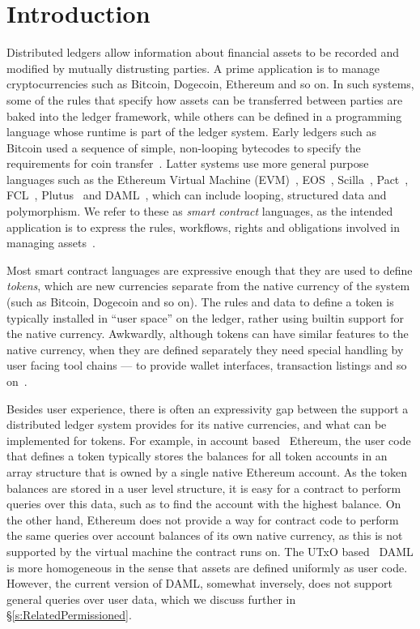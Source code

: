 
\section{Introduction}
Distributed ledgers allow information about financial assets to be recorded and modified by mutually distrusting parties. A prime application is to manage cryptocurrencies such as Bitcoin, Dogecoin, Ethereum and so on. In such systems, some of the rules that specify how assets can be transferred between parties are baked into the ledger framework, while others can be defined in a programming language whose runtime is part of the ledger system. Early ledgers such as Bitcoin used a sequence of simple, non-looping bytecodes to specify the requirements for coin transfer~\cite{Atzei2017:BitcoinTransactions}. Latter systems use more general purpose languages such as the Ethereum Virtual Machine (EVM)~\cite{Wood2014:Ethereum}, EOS~\cite{Grigg2017:EosIntroduction}, Scilla~\cite{Sergey2018:Scilla}, Pact~\cite{Popejpy2016:Pact}, FCL~\cite{Adjoint2019:FCL}, Plutus~\cite{IOHK2018:Plutus} and DAML~\cite{DA2019:DAML}, which can include looping, structured data and polymorphism. We refer to these as \emph{smart contract} languages, as the intended application is to express the rules, workflows, rights and obligations involved in managing assets~\cite{Harz2018:SurveyLanguages}.

Most smart contract languages are expressive enough that they are used to define \emph{tokens}, which are new currencies separate from the native currency of the system (such as Bitcoin, Dogecoin and so on). The rules and data to define a token is typically installed in ``user space'' on the ledger, rather using builtin support for the native currency. Awkwardly, although tokens can have similar features to the native currency, when they are defined separately they need special handling by user facing tool chains --- to provide wallet interfaces, transaction listings and so on~\cite{Vogelsteller2015:ERC20}.

Besides user experience, there is often an expressivity gap between the support a distributed ledger system provides for its native currencies, and what can be implemented for tokens. For example, in account based~\cite{Zahnentferner2018:Chimeric} Ethereum, the user code that defines a token typically stores the balances for all token accounts in an array structure that is owned by a single native Ethereum account. As the token balances are stored in a user level structure, it is easy for a contract to perform queries over this data, such as to find the account with the highest balance. On the other hand, Ethereum does not provide a way for contract code to perform the same queries  over account balances of its own native currency, as this is not supported by the virtual machine the contract runs on. The UTxO based~\cite{Zahnentferner2018:UTxO} DAML is more homogeneous in the sense that assets are defined uniformly as user code. However, the current version of DAML, somewhat inversely, does not support general queries over user data, which we discuss further in \S\ref{s:RelatedPermissioned}.

